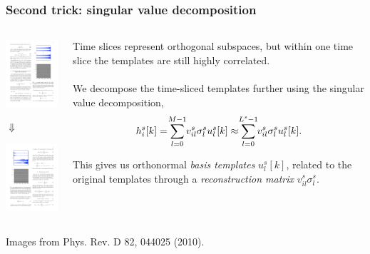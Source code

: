\documentclass{beamer}
\begin{document}
\begin{frame}
	\frametitle{Second trick: singular value decomposition}
	\begin{columns}
		\begin{column}{0.4\textwidth}
			\begin{center}
				\includegraphics[width=3.5cm]{figures/original-templates}
			
				$\Downarrow$
			
				\includegraphics[width=3.5cm]{figures/svd-templates}
			\end{center}
		\end{column}
		\begin{column}{0.6\textwidth}
			Time slices represent orthogonal subspaces, but within one time slice the templates are still highly correlated. \\~\\

			We decompose the time-sliced templates further using the singular value decomposition,
			$$h_i^s[k] = \sum_{\mathclap{l=0}}^{\mathclap{M-1}} v_{il}^s \sigma_l^s u_l^s[k] \approx \sum_{\mathclap{l=0}}^{\mathclap{L^s-1}} v_{il}^s \sigma_l^s u_l^s[k].$$

			This gives us orthonormal \emph{\color{ink3}basis templates} $u_l^s[k]$, related to the original templates through a \emph{\color{ink3}reconstruction matrix} $v_{il}^s\sigma_l^s$.
		\end{column}
	\end{columns}
	\footnotesize{Images from Phys. Rev. D 82, 044025 (2010).}
\end{frame}
\end{document}
